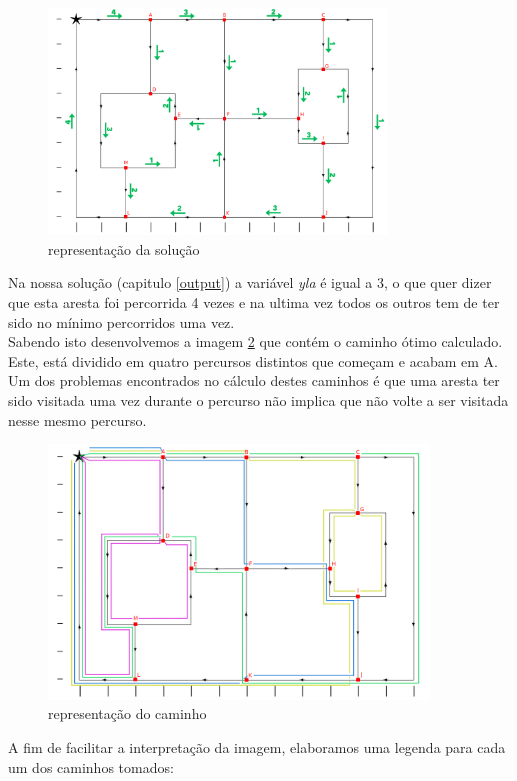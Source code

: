 \documentclass[a4paper]{report}
\begin{document}
\begin{figure}[H]
    \begin{center}
        \includegraphics[width=0.8\textwidth]{images/desafioVisited.png}\par
        \caption{representação da solução}
        \label{fig:visited}
    \end{center}
\end{figure}
Na nossa solução (capitulo \ref{output}) a variável \textit{yla} é igual a 3, o
que quer dizer que esta aresta foi percorrida 4 vezes e na ultima vez todos os
outros tem de ter sido no mínimo percorridos uma vez.\\
Sabendo isto desenvolvemos a imagem \ref{fig:path} que contém o caminho ótimo
calculado. Este, está dividido em quatro percursos distintos que começam e
acabam em A.\\
Um dos problemas encontrados no cálculo destes caminhos é que uma aresta ter
sido visitada uma vez durante o percurso não implica que não volte a ser
visitada nesse mesmo percurso.

\begin{figure}[H]
    \begin{center}
        \includegraphics[width=0.9\textwidth]{images/desafioSolucao.png}\par
        \caption{representação do caminho}
        \label{fig:path}
    \end{center}
\end{figure}
A fim de facilitar a interpretação da imagem, elaboramos uma legenda para cada
um dos caminhos tomados:
\end{document}
